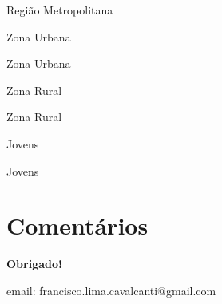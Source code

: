 \documentclass[8pt]{beamer}
\begin{document}
\begin{frame}[label=amzmetropolitanacnae2dig]{Região Metropolitana}
\textit{\hyperlink{indice_principal}{}}

\end{frame}


\begin{frame}[label=amzurbanacod2dig]{Zona Urbana}
\textit{\hyperlink{indice_principal}{}}

\end{frame}

\begin{frame}[label=amzurbanacnae2dig]{Zona Urbana}
\textit{\hyperlink{indice_principal}{}}

\end{frame}

\begin{frame}[label=amzruralcod2dig]{Zona Rural}
\textit{\hyperlink{indice_principal}{}}

\end{frame}

\begin{frame}[label=amzruralcnae2dig]{Zona Rural}
\textit{\hyperlink{indice_principal}{}}

\end{frame}

\begin{frame}[label=amzjovemcod2dig]{Jovens}
\textit{\hyperlink{indice_principal}{}}

\end{frame}

\begin{frame}[label=amzjovemcnae2dig]{Jovens}
\textit{\hyperlink{indice_principal}{}}

\end{frame}


\section{Comentários}

\frame
{
\begin{center}
	\vfill
	\textbf{Obrigado!}
	\\

	\begin{small}
	email: francisco.lima.cavalcanti@gmail.com
	\end{small}
	\vfill     
\end{center}
}
\end{document}
